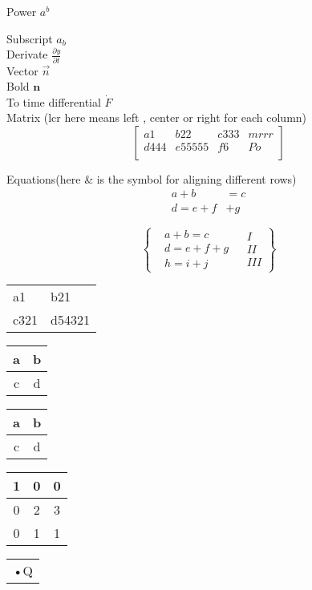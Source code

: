 \documentclass[a4paper,11pt]{book} %
\begin{document}
	Power $a^b$

	Subscript $a_b$\\
	Derivate $\frac{\partial y}{\partial t}$\\
	Vector $\vec{n}$\\
	Bold $\mathbf{n}$\\
	To time differential $\dot{F}$\\
	Matrix (lcr here means left , center or right for each column)
	\[
		\left[
			\begin{array}{llcr}
				a1 & b22 & c333 & mrrr\\
				d444 & e55555 & f6 & Po\\
			\end{array}
		\right]
	\]

	Equations(here \& is the symbol for aligning different rows)
	\begin{align}
		a+b&=c\\
		d=e+f&+g
	\end{align}

	\[
		\left\{ %
			\begin{aligned}
				&a+b=c\\
				&d=e+f+g\\
				&h=i+j
			\end{aligned} %
			\begin{aligned}
				&I \\
				&II\\
				&III
			\end{aligned}
		\right\}%
	\]
	
	\begin{center}
	\end{center}


	\begin{tabular}{ll|}
		\hline
		\vline a1 &  \vline b21 \\
		c321 & d54321 \\
	\end{tabular}
	\begin{tabular}{|c|c|}
		\hline
		a & b \\
		\hline
		c & d \\
		\hline
	\end{tabular}	
	\begin{center}
		\begin{tabular}{|c|c|}
			\hline
			a & b \\ \hline
			c & d \\
			\hline
		\end{tabular}
	\end{center}

    \begin{tabular}{|c|c|c|}
      \hline
      1 & 0 & 0 \\ \hline
      0 & 2 & 3 \\ \hline
      0 & 1 & 1 \\
      \hline
    \end{tabular}
	
	\begin{tabular}{|r|}
	•Q
	\end{tabular}
\end{document}
